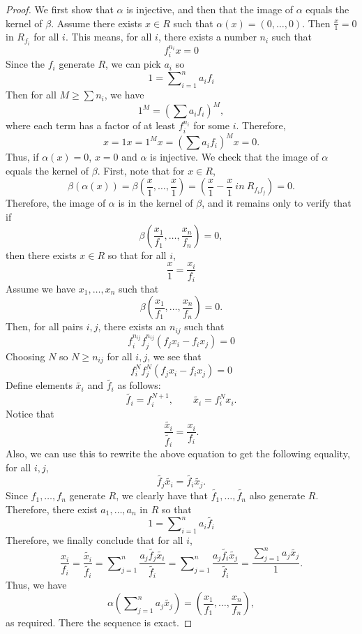 \begin{proof}
We first show that $\alpha$ is injective,
and then that the image of $\alpha$ equals the kernel of $\beta$.
Assume there exists $x\in R$ such that $\alpha(x)=(0,\ldots,0)$.
Then $\frac{x}{1}=0$ in $R_{f_i}$ for all $i$.
This means, for all $i$, there exists a number $n_i$ such that
\[
f_i^{n_i}x=0
\]
Since the $f_i$ generate $R$, we can pick $a_i$ so
\[
1=\sum\nolimits_{i=1}^n a_if_i
\] 
Then for all $M\geq\sum n_i$, we have
\[
1^M=\left(\sum a_if_i\right)^M,
\]
where each term has a factor of at least $f_i^{n_i}$ for some $i$.
Therefore,
\[
x=1x=1^Mx=\left(\sum a_if_i\right)^Mx=0.
\]
Thus, if $\alpha(x)=0$, $x=0$ and $\alpha$ is injective.
We check that the image of $\alpha$ equals the kernel of $\beta$.
First, note that for $x\in R$,
\[
\beta(\alpha(x)) =
\beta\left(\frac{x}{1},\ldots,\frac{x}{1}\right) =
(\frac{x}{1}-\frac{x}{1}~in~R_{f_if_j}) = 0.
\]
Therefore, the image of $\alpha$ is in the kernel of $\beta$,
and it remains only to verify that if
\[
\beta\left(\frac{x_1}{f_1},\ldots,\frac{x_n}{f_n}\right)=0,
\]
then there exists $x\in R$ so that for all $i$,
\[
\frac{x}{1}=\frac{x_i}{f_i}
\]
Assume we have $x_1,\ldots, x_n$ such that
\[
\beta\left(\frac{x_1}{f_1},\ldots,\frac{x_n}{f_n}\right)=0.
\]
Then, for all pairs $i,j$, there exists an $n_{ij}$ such that
\[
f_i^{n_{ij}}f_j^{n_{ij}}(f_jx_i-f_ix_j)=0
\]
Choosing $N$ so $N\geq n_{ij}$ for all $i,j$, we see that
\[
f_i^Nf_j^N(f_jx_i-f_ix_j)=0
\]
Define elements $\widetilde{x_i}$ and $\widetilde{f_i}$ as follows:
\[
\widetilde{f_i}=f_i^{N+1},\qquad \widetilde{x_i}=f_i^N x_i.
\]
Notice that
\[
\frac{\widetilde{x_i}}{\widetilde{f_i}}=\frac{x_i}{f_i}.
\]
Also, we can use this to rewrite the above equation to get
the following equality, for all $i,j$,
\[
\widetilde{f_j}\widetilde{x_i}=\widetilde{f_i}\widetilde{x_j}.
\]
Since $f_1,\ldots, f_n$ generate $R$, we clearly have that
$\widetilde{f_1},\ldots,\widetilde{f_n}$ also generate $R$.
Therefore, there exist $a_1,\ldots,a_n$ in $R$ so that
\[
1=\sum\nolimits_{i=1}^n a_i\widetilde{f_i}
\]
Therefore, we finally conclude that for all $i$,
\[
\frac{x_i}{f_i} =
\frac{\widetilde{x_i}}{\widetilde{f_i}} =
\sum\nolimits_{j=1}^n\frac{a_j\widetilde{f_j}\widetilde{x_i}}{\widetilde{f_i}} =
\sum\nolimits_{j=1}^n\frac{a_j\widetilde{f_i}\widetilde{x_j}}{\widetilde{f_i}} =
\frac{\sum_{j=1}^na_j\widetilde{x_j}}{1}.
\]
Thus, we have
\[
\alpha\left(\sum\nolimits_{j=1}^na_j\widetilde{x_j}\right) =
\left(\frac{x_1}{f_1},\ldots,\frac{x_n}{f_n}\right),
\]
as required.  There the sequence is exact.
\end{proof}

